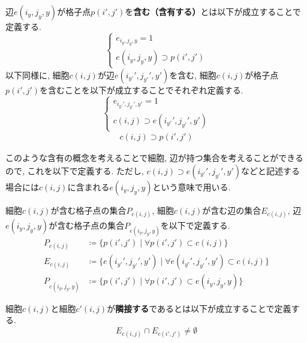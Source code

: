 \begin{definition}[含有]\label{definition:Contain}
  辺$e(i_y,j_y,y)$が格子点$p(i',j')$を\textbf{含む（含有する）}とは以下が成立することで定義する.
  \begin{equation*}
    \begin{cases}
      {e_{i_y,j_y,y}=1               } \\
      {e(i_y,j_y,y)\supset p(i',j')}
    \end{cases}
  \end{equation*}
  以下同様に, 細胞$c(i,j)$が辺$e(i_{y'}',j_{y'}',y')$を含む, 細胞$c(i,j)$が格子点$p(i',j')$を含むことを以下が成立することでそれぞれ定義する.
  \begin{equation*}
    \begin{cases}
      {e_{i_{y'}',j_{y'}',y'}=1 } \\
      {c(i,j)\supset e(i_{y'}',j_{y'}',y')}
    \end{cases}
  \end{equation*}
  \begin{align*}
    c(i,j)\supset p(i',j')
  \end{align*}
\end{definition}
このような含有の概念を考えることで細胞, 辺が持つ集合を考えることができるので, これを以下で定義する. ただし, $c(i,j)\supset e(i_{y'}',j_{y'}',y')$などと記述する場合には$c(i,j)$に含まれる$e(i_y,j_y,y)$という意味で用いる.
\begin{definition}[$P_{c(i,j)}$, $E_{c(i,j)}$, $P_{e(i_y,j_y,y)}$]
  細胞$c(i,j)$が含む格子点の集合$P_{c(i,j)}$, 細胞$c(i,j)$が含む辺の集合$E_{c(i,j)}$, 辺$e(i_y,j_y,y)$が含む格子点の集合$P_{e(i_y,j_y,y)}$を以下で定義する.
  \begin{align*}
    P_{c(i,j)}       & \coloneqq \{p(i',j') \mid \forall p(i',j') \subset c(i,j)\}                           \\
    E_{c(i,j)}       & \coloneqq \{e(i_{y'}',j_{y'}',y') \mid \forall e(i_{y'}',j_{y'}',y') \subset c(i,j)\} \\
    P_{e(i_y,j_y,y)} & \coloneqq \{p(i',j') \mid \forall p(i',j') \subset e(i_y,j_y,y)\}
  \end{align*}
\end{definition}


\begin{definition}[隣接]\label{definition:Adjacent}
  細胞$c(i,j)$と細胞$c'(i,j)$が\textbf{隣接する}であるとは以下が成立することで定義する.
  \begin{equation*}
    E_{c(i,j)} \cap E_{c(i',j')} \neq \emptyset
  \end{equation*}
\end{definition}


